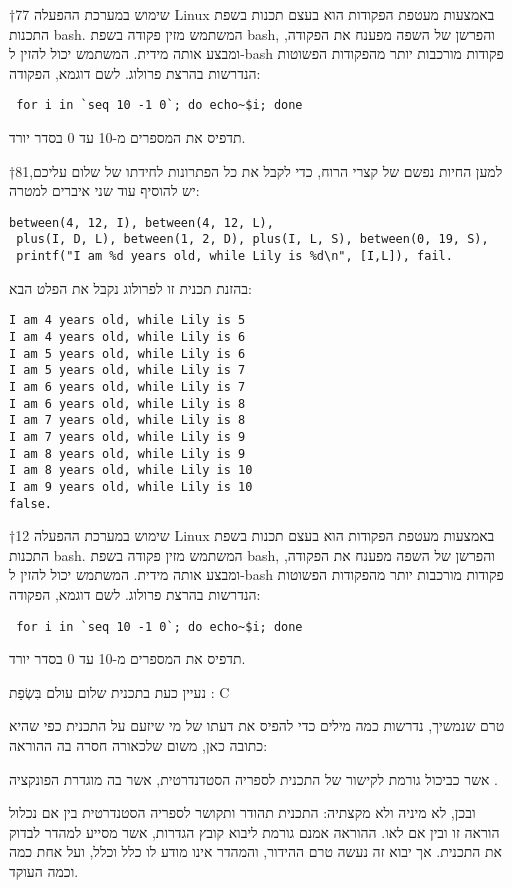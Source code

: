 †{77} שימוש במערכת ההפעלה Linux באמצעות 
מעטפת הפקודות הוא בעצם תכנות בשפת התכנות bash. המשתמש מזין פקודה בשפת bash,
והפרשן של השפה מפענח את הפקודה, ומבצע אותה מידית. המשתמש יכול להזין ל-bash
פקודות מורכבות יותר מהפקודות הפשוטות הנדרשות בהרצת פרולוג. לשם דוגמא, הפקודה:
\begin{verbatim}
 for i in `seq 10 -1 0`; do echo~$i; done
\end{verbatim}
        תדפיס את המספרים מ-10 עד 0 בסדר יורד.


†{81}למען החיות 
נפשם של קצרי הרוח, כדי לקבל את כל הפתרונות לחידתו של שלום עליכם, יש להוסיף עוד
שני איברים למטרה: 

\begin{verbatim}
between(4, 12, I), between(4, 12, L),
 plus(I, D, L), between(1, 2, D), plus(I, L, S), between(0, 19, S),
 printf("I am %d years old, while Lily is %d\n", [I,L]), fail.
\end{verbatim}
        בהזנת תכנית זו לפרולוג נקבל את הפלט הבא:
\begin{verbatim}
I am 4 years old, while Lily is 5
I am 4 years old, while Lily is 6
I am 5 years old, while Lily is 6
I am 5 years old, while Lily is 7
I am 6 years old, while Lily is 7
I am 6 years old, while Lily is 8
I am 7 years old, while Lily is 8
I am 7 years old, while Lily is 9
I am 8 years old, while Lily is 9
I am 8 years old, while Lily is 10
I am 9 years old, while Lily is 10
false.
\end{verbatim}

†{12} שימוש במערכת ההפעלה Linux באמצעות מעטפת הפקודות הוא בעצם תכנות בשפת
התכנות bash. המשתמש מזין פקודה בשפת bash, והפרשן של השפה מפענח את הפקודה, ומבצע
אותה מידית. המשתמש יכול להזין ל-bash פקודות מורכבות יותר מהפקודות הפשוטות
הנדרשות בהרצת פרולוג. לשם דוגמא, הפקודה:
\begin{verbatim}
 for i in `seq 10 -1 0`; do echo~$i; done
\end{verbatim}
        תדפיס את המספרים מ-10 עד 0 בסדר יורד.

נעיין כעת בתכנית שלום עולם בִּשְׂפַת :
{C}

טרם שנמשיך, נדרשות כמה מילים כדי להפיס את דעתו של מי שיזעם על התכנית כפי שהיא כתובה כאן, משום שלכאורה חסרה בה ההוראה:
\setLTR{}


\setRTL{}

אשר כביכול גורמת לקישור של התכנית לספריה הסטדנדרטית, אשר בה מוגדרת הפונקציה .

ובכן, לא מיניה ולא מקצתיה: התכנית תהודר ותקושר לספריה הסטנדרטית בין אם נכלול
הוראה זו ובין אם לאו. ההוראה אמנם גורמת ליבוא קובץ הגדרות, אשר מסייע למהדר
לבדוק את התכנית. אך יבוא זה נעשה טרם ההידור, והמהדר אינו מודע לו כלל וכלל, ועל
אחת כמה וכמה העוקד.

